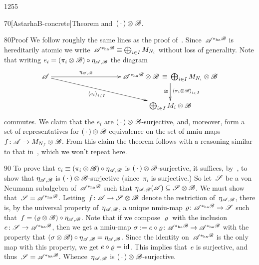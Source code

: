 \begin{parsec}{1255}
\begin{point}{70}[AstarhaB-concrete]{Theorem}
and~$(\,\cdot\,)\otimes\mathscr{B}$.
\begin{point}{80}{Proof}%
We follow roughly the same lines
    as the proof of~.
Since~$\mathscr{A}^{*_\mathrm{ha}\mathscr{B}}$
is hereditarily atomic
we write~$\mathscr{A}^{*_\mathrm{ha}\mathscr{B}}
\equiv \bigoplus_{i\in I} M_{N_i}$
without loss of generality.
Note that writing $e_i = (\pi_i\otimes \mathscr{B})\circ \eta_{\mathscr{A},\mathscr{B}}$
the diagram
\begin{equation*}
\xymatrix@C=10em{
\scrA
    \ar[r]^-{\eta_{\scrA,\scrB}}
    \ar[rd]_-{\left<e_i\right>_{i\in I}}
&
\scrA^{*_\mathrm{ha}\scrB}\otimes \scrB
    \,\equiv\, \bigoplus_{i\in I}M_{N_i}\otimes \scrB
    \ar[d]_{\cong}^{\left<\pi_i\otimes \scrB\right>_{i \in I}}
\\
&
\bigoplus_{i \in I} M_i\otimes \scrB
}
\end{equation*}
commutes.
We claim that the $e_i$ are $(\,\cdot\,)\otimes \mathscr{B}$-surjective,
and, moreover,
form a set of representatives
for $(\,\cdot\,)\otimes \mathscr{B}$-equivalence
on the set of nmiu-maps
    $f\colon \mathscr{A}\to M_{N_f}\otimes \mathscr{B}$.
From this claim the theorem follows
with a reasoning similar to that
in~, which we won't repeat here.
\begin{point}{90}
To prove that $e_i\equiv (\pi_i \otimes \mathscr{B})\circ \eta_{\mathscr{A},\mathscr{B}}$
is $(\,\cdot\,)\otimes\mathscr{B}$-surjective,
it suffices,
by~,
to show that $\eta_{\mathscr{A},\mathscr{B}}$
is $(\,\cdot\,)\otimes \mathscr{B}$-surjective
(since~$\pi_i$ is surjective.)
So let~$\mathscr{S}$ be a von Neumann subalgebra of~$\mathscr{A}^{*_\mathrm{ha}\mathscr{B}}$
such that $\eta_{\mathscr{A},\mathscr{B}}(\mathscr{A})\subseteq
\mathscr{S} \otimes \mathscr{B}$.
We must show that~$\mathscr{S} = \mathscr{A}^{*_\mathrm{ha}\mathscr{B}}$.
Letting~$f\colon \mathscr{A}\to\mathscr{S}\otimes \mathscr{B}$
denote the restriction of~$\eta_{\mathscr{A},\mathscr{B}}$,
there is, by the universal property of~$\eta_{\mathscr{A},\mathscr{B}}$,
a unique nmiu-map $\varrho\colon \mathscr{A}^{*_\mathrm{ha}\mathscr{B}}
\to \mathscr{S}$
such that~$f= (\varrho\otimes \mathscr{B}) \circ \eta_{\mathscr{A},\mathscr{B}}$.
Note that if we compose $\varrho$ with the inclusion
    $e\colon \mathscr{S}\to \mathscr{A}^{*_\mathrm{ha}\mathscr{B}}$,
    then
we get a nmiu-map $\sigma := e\circ \varrho\colon 
    \mathscr{A}^{*_\mathrm{ha}\mathscr{B}}
    \to\mathscr{A}^{*_\mathrm{ha}\mathscr{B}}$
    with the property
    that 
    $(\sigma\otimes\mathscr{B})\circ \eta_{\mathscr{A},\mathscr{B}} = \eta_{\mathscr{A},\mathscr{B}}$.
Since the identity on~$\mathscr{A}^{*_\mathrm{ha}\mathscr{B}}$
is the only map with this property,
we get $e \circ \varrho = \mathrm{id}$.
This implies that~$e$ is surjective,
and thus~$\mathscr{S}=
    \mathscr{A}^{*_\mathrm{ha}\mathscr{B}}$.
    Whence~$\eta_{\mathscr{A},\mathscr{B}}$
    is $(\,\cdot\,)\otimes \mathscr{B}$-surjective.


\end{point}
\end{point}
\end{point}
\end{parsec}
